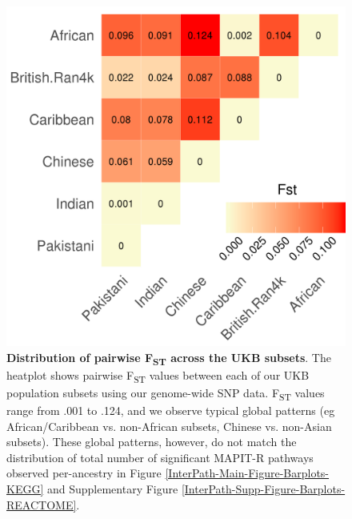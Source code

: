 \documentclass[12pt,a4paper]{article}
\begin{document}
\begin{figure}[htb]
\centering
\includegraphics[scale=.5]{Images/Main/InterPath_Main_Figure_Fst_vs2.png}
\caption[TBD]{\textbf{Distribution of pairwise F\textsubscript{ST} across the UKB subsets}. The heatplot shows pairwise F\textsubscript{ST} values between each of our UKB population subsets using our genome-wide SNP data. F\textsubscript{ST} values range from .001 to .124, and we observe typical global patterns (eg African/Caribbean vs. non-African subsets, Chinese vs. non-Asian subsets). These global patterns, however, do not match the distribution of total number of significant MAPIT-R pathways observed per-ancestry in Figure \ref{InterPath-Main-Figure-Barplots-KEGG} and Supplementary Figure \ref{InterPath-Supp-Figure-Barplots-REACTOME}.}
\label{InterPath-Main-Figure-Fst}
\end{figure}
\end{document}
